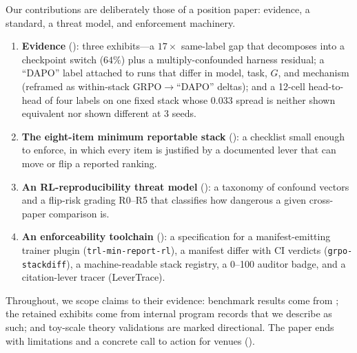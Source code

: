 Our contributions are deliberately those of a position paper: evidence, a
standard, a threat model, and enforcement machinery.
\begin{enumerate}[leftmargin=1.5em, itemsep=1pt, topsep=2pt]
\item \textbf{Evidence} (): three exhibits---a
$17\times$ same-label gap that decomposes into a checkpoint switch ($64\%$)
plus a multiply-confounded harness residual; a ``DAPO'' label attached to runs
that differ in model, task, $G$, and mechanism (reframed as within-stack
GRPO$\to$``DAPO'' deltas); and a 12-cell head-to-head of four labels on one
fixed stack whose $0.033$ spread is neither shown equivalent nor shown
different at 3 seeds.
\item \textbf{The eight-item minimum reportable stack} ():
a checklist small enough to enforce, in which every item is justified by a
documented lever that can move or flip a reported ranking.
\item \textbf{An RL-reproducibility threat model} (): a
taxonomy of confound vectors and a flip-risk grading R0--R5 that classifies how
dangerous a given cross-paper comparison is.
\item \textbf{An enforceability toolchain} (): a
specification for a manifest-emitting trainer plugin
(\texttt{trl-min-report-rl}), a manifest differ with CI verdicts
(\texttt{grpo-stackdiff}), a machine-readable stack registry, a 0--100 auditor
badge, and a citation-lever tracer (LeverTrace).
\end{enumerate}
Throughout, we scope claims to their evidence: benchmark results come from
\ours{}; the retained exhibits come from internal program
records that we describe as such; and toy-scale theory validations are marked
directional. The paper ends with limitations and a concrete call to action for
venues ().
